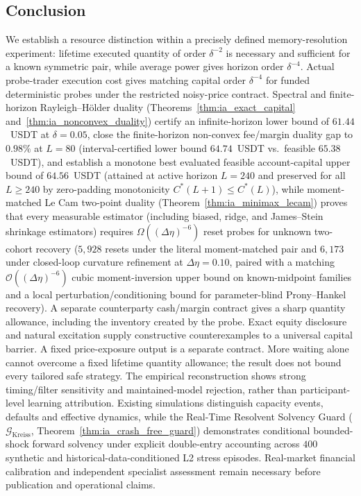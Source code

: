 \documentclass[12pt]{article}
\theoremstyle{definition}
\theoremstyle{remark}
\begin{document}
\subsection{Conclusion}
We establish a resource distinction within a precisely defined memory-resolution experiment: lifetime executed quantity of order $\delta^{-2}$ is necessary and sufficient for a known symmetric pair, while average power gives horizon order $\delta^{-4}$. Actual probe-trader execution cost gives matching capital order $\delta^{-4}$ for funded deterministic probes under the restricted noisy-price contract. Spectral and finite-horizon Rayleigh--H\"older duality (Theorems~\ref{thm:ia_exact_capital} and~\ref{thm:ia_nonconvex_duality}) certify an infinite-horizon lower bound of $61.44$~USDT at $\delta=0.05$, close the finite-horizon non-convex fee/margin duality gap to $0.98\%$ at $L=80$ (interval-certified lower bound $64.74$~USDT vs.\ feasible $65.38$~USDT), and establish a monotone best evaluated feasible account-capital upper bound of $64.56$~USDT (attained at active horizon $L=240$ and preserved for all $L \ge 240$ by zero-padding monotonicity $C^*(L+1) \le C^*(L)$), while moment-matched Le Cam two-point duality (Theorem~\ref{thm:ia_minimax_lecam}) proves that every measurable estimator (including biased, ridge, and James--Stein shrinkage estimators) requires $\Omega((\Delta\eta)^{-6})$ reset probes for unknown two-cohort recovery ($5{,}928$ resets under the literal moment-matched pair and $6{,}173$ under closed-loop curvature refinement at $\Delta\eta=0.10$, paired with a matching $\mathcal{O}((\Delta\eta)^{-6})$ cubic moment-inversion upper bound on known-midpoint families and a local perturbation/conditioning bound for parameter-blind Prony--Hankel recovery). A separate counterparty cash/margin contract gives a sharp quantity allowance, including the inventory created by the probe. Exact equity disclosure and natural excitation supply constructive counterexamples to a universal capital barrier. A fixed price-exposure output is a separate contract. More waiting alone cannot overcome a fixed lifetime quantity allowance; the result does not bound every tailored safe strategy. The empirical reconstruction shows strong timing/filter sensitivity and maintained-model rejection, rather than participant-level learning attribution. Existing simulations distinguish capacity events, defaults and effective dynamics, while the Real-Time Resolvent Solvency Guard ($\mathcal{G}_{\mathrm{Kreiss}}$, Theorem~\ref{thm:ia_crash_free_guard}) demonstrates conditional bounded-shock forward solvency under explicit double-entry accounting across $400$ synthetic and historical-data-conditioned L2 stress episodes. Real-market financial calibration and independent specialist assessment remain necessary before publication and operational claims.
\end{document}

